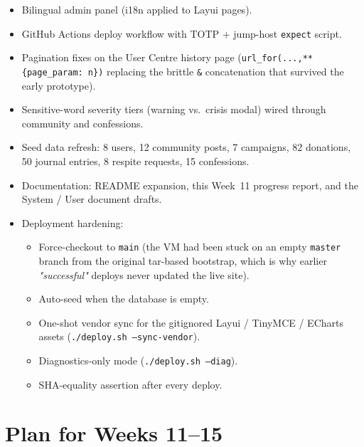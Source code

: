 \begin{itemize}
  \item Bilingual admin panel (i18n applied to Layui pages).
  \item GitHub Actions deploy workflow with TOTP + jump-host
        \texttt{expect} script.
  \item Pagination fixes on the User Centre history page
        (\texttt{url\_for(...,**\{page\_param: n\})} replacing the brittle
        \texttt{\&} concatenation that survived the early prototype).
  \item Sensitive-word severity tiers (warning vs.\ crisis modal) wired
        through community and confessions.
  \item Seed data refresh: 8 users, 12 community posts, 7 campaigns,
        82 donations, 50 journal entries, 8 respite requests, 15
        confessions.
  \item Documentation: README expansion, this Week~11 progress report,
        and the System / User document drafts.
  \item Deployment hardening:
        \begin{itemize}
          \item Force-checkout to \texttt{main} (the VM had been stuck
                on an empty \texttt{master} branch from the original
                tar-based bootstrap, which is why earlier
                \emph{"successful"} deploys never updated the live
                site).
          \item Auto-seed when the database is empty.
          \item One-shot vendor sync for the gitignored Layui / TinyMCE
                / ECharts assets (\texttt{./deploy.sh --sync-vendor}).
          \item Diagnostics-only mode (\texttt{./deploy.sh --diag}).
          \item SHA-equality assertion after every deploy.
        \end{itemize}
\end{itemize}

\section{Plan for Weeks 11–15}

